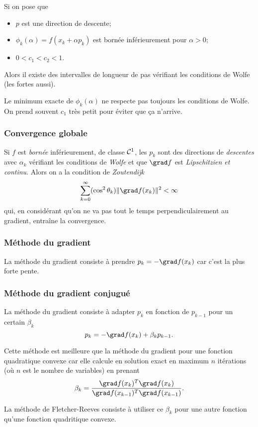 Si on pose que
\begin{itemize}
  \item $p$ est une direction de descente;
  \item $\phi_k(\alpha) = f(x_k + \alpha p_k)$ est bornée inférieurement
    pour $\alpha > 0$;
  \item $0 < c_1 < c_2 < 1$.
\end{itemize}
Alors il existe des intervalles de longueur de pas vérifiant les
conditions de Wolfe (les fortes aussi).

Le minimum exacte de $\phi_k(\alpha)$ ne respecte pas toujours
les conditions de Wolfe.
On prend souvent $c_1$ très petit pour éviter que ça n'arrive.

\subsubsection{Convergence globale}
Si $f$ est \emph{bornée} inférieurement, de classe $\mathcal{C}^1$,
les $p_k$ sont des directions de \emph{descentes} avec $\alpha_k$ vérifiant
les conditions de \emph{Wolfe} et
que $\grad f$ est \emph{Lipschitzien et continu}.
Alors on a la condition de \emph{Zoutendijk}
\[ \sum_{k=0}^\infty (\cos^2\theta_k) \|\grad f(x_k)\|^2 < \infty \]
qui, en considérant qu'on ne va pas tout le temps perpendiculairement
au gradient, entraîne la convergence.

\subsubsection{Méthode du gradient}
La méthode du gradient consiste à prendre
$p_k = -\grad f(x_k)$
car c'est la plus forte pente.

\subsubsection{Méthode du gradient conjugué}
La méthode du gradient consiste à adapter $p_k$ en fonction de
$p_{k-1}$ pour un certain $\beta_k$
\[ p_k = -\grad f(x_k) + \beta_k p_{k-1}. \]

Cette méthode est meilleure que la méthode du gradient pour
une fonction quadratique convexe car elle calcule en solution
exact en maximum $n$ itérations (où $n$ est le nombre de variables)
en prenant
\[ \beta_k = \frac{\grad f(x_{k})^T\grad f(x_{k})}
{\grad f(x_{k-1})^T\grad f(x_{k-1})}. \]

La méthode de Fletcher-Reeves consiste à
utiliser ce $\beta_k$ pour une autre fonction qu'une fonction
quadritique convexe.

